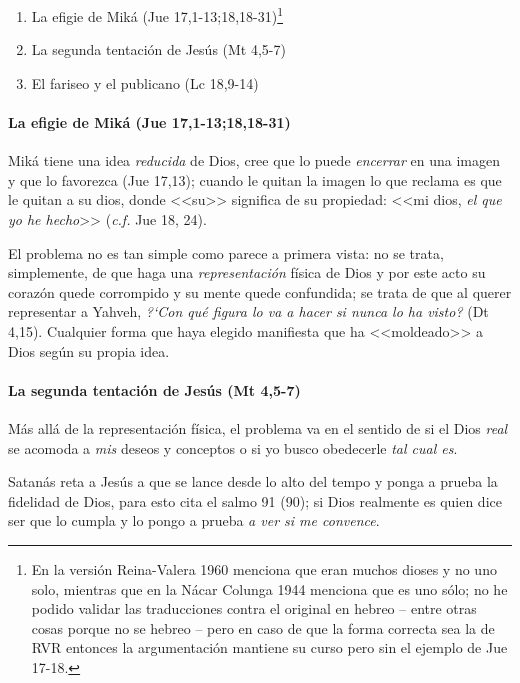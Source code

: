 \documentclass{article}
\begin{document}
\begin{enumerate}
\item La efigie de Mik\'a (Jue 17,1-13;18,18-31)\footnote{En la versi\'on Reina-Valera 1960 menciona que eran muchos dioses y no uno solo, mientras que en la N\'acar Colunga 1944 menciona que es uno s\'olo; no he podido validar las traducciones contra el original en hebreo -- entre otras cosas porque no se hebreo -- pero en caso de que la forma correcta sea la de RVR entonces la argumentaci\'on mantiene su curso pero sin el ejemplo de Jue 17-18.}
\item La segunda tentaci\'on de Jes\'us (Mt 4,5-7)
\item El fariseo y el publicano (Lc 18,9-14)
\end{enumerate}

\paragraph{La efigie de Mik\'a (Jue 17,1-13;18,18-31)}

Mik\'a tiene una idea \emph{reducida} de Dios, cree que lo puede \emph{encerrar} en una imagen y que lo favorezca (Jue 17,13); cuando le quitan la imagen lo que reclama es que le quitan a su dios, donde <<su>> significa de su propiedad: <<mi dios, \emph{el que yo he hecho}>> (\emph{c.f.} Jue 18, 24).

El problema no es tan simple como parece a primera vista: no se trata, simplemente, de que haga una \emph{representaci\'on} f\'{i}sica de Dios y por este acto su coraz\'on quede corrompido y su mente quede confundida; se trata de que al querer representar a Yahveh, \emph{?`Con qu\'e figura lo va a hacer si nunca lo ha visto?} (Dt 4,15). Cualquier forma que haya elegido manifiesta que ha <<moldeado>> a Dios seg\'un su propia idea.

\paragraph{La segunda tentaci\'on de Jes\'us (Mt 4,5-7)}

M\'as all\'a de la representaci\'on f\'{i}sica, el problema va en el sentido de si el Dios \emph{real} se acomoda a \emph{mis} deseos y conceptos o si yo busco obedecerle \emph{tal cual es}.

Satan\'as reta a Jes\'us a que se lance desde lo alto del tempo y ponga a prueba la fidelidad de Dios, para esto cita el salmo 91 (90); si Dios realmente es quien dice ser que lo cumpla y lo pongo a prueba \emph{a ver si me convence}.
\end{document}
